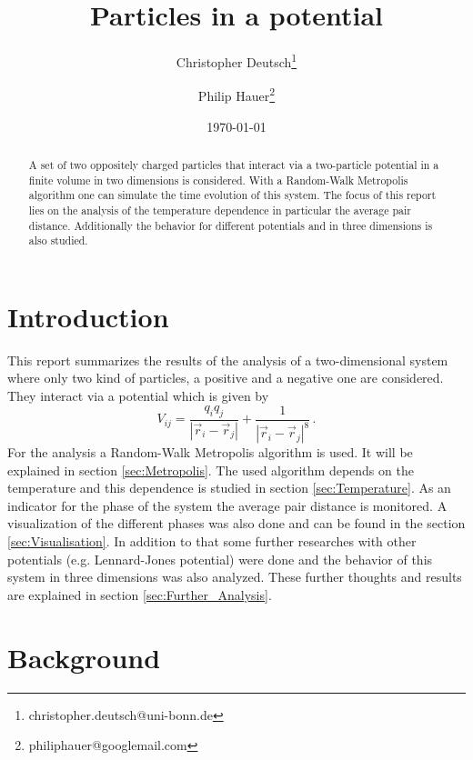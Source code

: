 \documentclass[11pt, a4paper]{article}
\title{Particles in a potential}
\author{Christopher Deutsch\footnote{christopher.deutsch@uni-bonn.de} \and Philip Hauer\footnote{philiphauer@googlemail.com}}
\date{\today}
\numberwithin{equation}{section}
\begin{document}
\begin{titlepage}

\maketitle

\begin{abstract}
\noindent 
A set of two oppositely charged particles that interact via a two-particle potential in a finite volume in two dimensions is considered.
With a Random-Walk Metropolis algorithm one can simulate the time evolution of this system.
The focus of this report lies on the analysis of the temperature dependence in particular the average pair distance.
Additionally the behavior for different potentials and in three dimensions is also studied.
\end{abstract}

\end{titlepage}

\tableofcontents
\newpage


\section{Introduction}
This report summarizes the results of the analysis of a two-dimensional system where only two kind of particles, a positive and a negative one are considered.
They interact via a potential which is given by
\begin{equation}
V_{ij} = \frac{q_i q_j}{\left| \vec{r}_i - \vec{r}_j \right|} + \frac{1}{\left| \vec{r}_i - \vec{r}_j \right|^8} \, \text{.} \label{Eq:Potential}
\end{equation}
For the analysis a Random-Walk Metropolis algorithm is used. It will be explained in section \ref{sec:Metropolis}.
The used algorithm depends on the temperature and this dependence is studied in section \ref{sec:Temperature}.
As an indicator for the phase of the system the average pair distance is monitored.
A visualization of the different phases was also done and can be found in the section \ref{sec:Visualisation}.
In addition to that some further researches with other potentials (e.g. Lennard-Jones potential) were done and the behavior of this system in three dimensions was also analyzed.
These further thoughts and results are explained in section \ref{sec:Further_Analysis}.


\section{Background}
\end{document}

